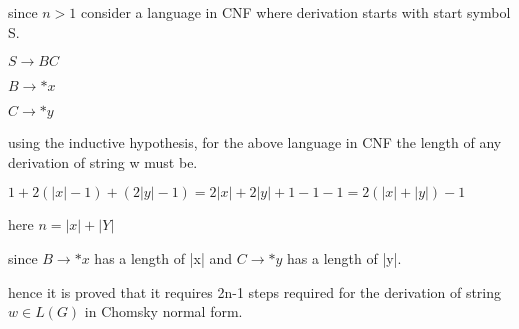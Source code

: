 \documentclass[11pt]{article}
\theoremstyle{thmstyle}
\begin{document}
\begin{itemize}
since $n>1$ consider a language in CNF where derivation starts with start symbol S.

$S \rightarrow BC$

$B \rightarrow *x$

$C \rightarrow *y$

using the inductive hypothesis, for the above language in CNF the length of any derivation of string w must be.

$1+2(|x|-1)+(2|y|-1)=2|x|+2|y|+1-1-1=2(|x|+|y|)-1$

here $n = |x|+|Y|$

since $B \rightarrow *x$ has a length of |x| and $C \rightarrow *y$ has a length of |y|.

hence it is proved that it requires 2n-1 steps required for the derivation of string  $w \in L(G)$ in Chomsky normal form.
 
\end{itemize}
\end{document}
